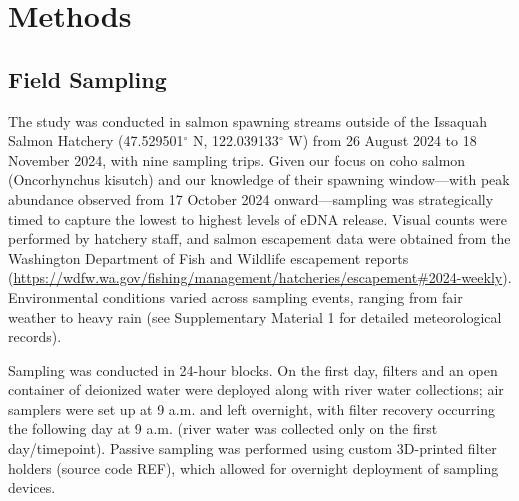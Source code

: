 \documentclass{article}
\begin{document}
\section{Methods}

\subsection{Field Sampling}

The study was conducted in salmon spawning streams outside of the Issaquah Salmon Hatchery (47.529501$^\circ$ N, 122.039133$^\circ$ W) from 26 August 2024 to 18 November 2024, with nine sampling trips. Given our focus on coho salmon (Oncorhynchus kisutch) and our knowledge of their spawning window—with peak abundance observed from 17 October 2024 onward—sampling was strategically timed to capture the lowest to highest levels of eDNA release. Visual counts were performed by hatchery staff, and salmon escapement data were obtained from the Washington Department of Fish and Wildlife escapement reports (\href{https://wdfw.wa.gov/fishing/management/hatcheries/escapement#2024-weekly}{https://wdfw.wa.gov/fishing/management/hatcheries/escapement\#2024-weekly}). Environmental conditions varied across sampling events, ranging from fair weather to heavy rain (see Supplementary Material 1 for detailed meteorological records).

Sampling was conducted in 24-hour blocks. On the first day, filters and an open container of deionized water were deployed along with river water collections; air samplers were set up at 9 a.m. and left overnight, with filter recovery occurring the following day at 9 a.m. (river water was collected only on the first day/timepoint). Passive sampling was performed using custom 3D-printed filter holders (source code REF), which allowed for overnight deployment of sampling devices.
\end{document}
